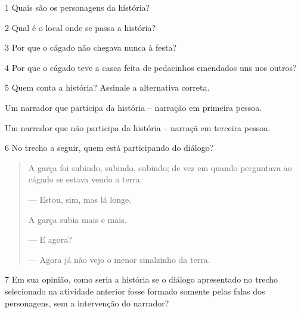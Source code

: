 
\num{1} Quais são os personagens da história?


\num{2} Qual é o local onde se passa a história?


\num{3} Por que o cágado não chegava nunca à festa?


\num{4} Por que o cágado teve a casca feita de pedacinhos emendados uns nos
outros?


\num{5} Quem conta a história? Assinale a alternativa correta.

\begin{boxlist}
 Um narrador que participa da história -- narração em primeira pessoa.

 Um narrador que não participa da história -- narraçã em terceira pessoa.
\end{boxlist}

\num{6} No trecho a seguir, quem está participando do diálogo?

\begin{quote}
A garça foi subindo, subindo, subindo; de vez em quando perguntava ao
cágado se estava vendo a terra.

--- Estou, sim, mas lá longe.

A garça subia mais e mais.

--- E agora?

--- Agora já não vejo o menor sinalzinho da terra.
\end{quote}


\num{7} Em sua opinião, como seria a história se o diálogo apresentado no trecho selecionado na atividade anterior fosse formado
somente pelas falas dos personagens, sem a intervenção do narrador?




